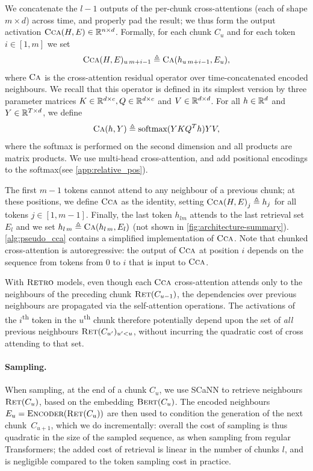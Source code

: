 \documentclass[11pt, a4paper, logo]{deepmind}
\newcommand{\encoder} {\textsc{Encoder}}
\newcommand{\ccca}{\textsc{Cca}}
\newcommand{\crossattention}{\textsc{Ca}}
\newcommand{\softmax}{\textrm{softmax}}
\newcommand{\ret}{\textsc{Ret}}
\newcommand{\bert}{\textsc{Bert}\xspace}
\renewcommand{\encoder}{\textsc{Encoder}}
\newcommand{\retro}{\textsc{Retro}\xspace}
\begin{document}
We concatenate the $l{-}1$ outputs of the per-chunk cross-attentions (each of shape $m \times d$) across time, and properly pad the result; we thus form the output activation $\ccca(H, E) \in \RR^{n \times d}$. Formally, for each chunk $C_u$ and for each token $i \in [1, m]$ we set
\begin{equation}
    \ccca(H, E)_{u\, m + i - 1} \triangleq \crossattention(h_{u \,m + i - 1}, E_{u}),
\end{equation}
where $\crossattention$ is the cross-attention residual operator over time-concatenated encoded neighbours. We recall that this operator is defined in its simplest version by three parameter matrices $K \in \mathbb{R}^{d \times c}, Q \in \mathbb{R}^{d \times c}$ and $V \in \mathbb{R}^{d \times d}$. For all $h \in \mathbb{R}^d$ and $Y \in \mathbb{R}^{T \times d}$, we define
\begin{equation}
    \crossattention(h, Y) \triangleq \softmax(Y K Q^T h) Y V,
\end{equation}
where the softmax is performed on the second dimension and all products are matrix products. We use multi-head cross-attention, and add positional encodings to the \softmax (see \autoref{app:relative_pos}).

The first $m-1$ tokens cannot attend to any neighbour of a previous chunk; at these positions, we define $\ccca$ as the identity, setting ${\ccca(H, E)}_j \triangleq h_j$ for all tokens $j \in [1, m-1]$. 
Finally, the last token $h_{l m}$ attends to the last retrieval set $E_l$ and we set $h_{l\,m} \triangleq \crossattention(h_{l\,m}, E_l)$ (not shown in \autoref{fig:architecture-summary}). 
\autoref{alg:pseudo_cca} contains a simplified implementation of $\ccca$.
Note that chunked cross-attention is autoregressive: the output of $\ccca$ at position $i$ depends on the sequence from tokens from $0$ to $i$ that is input to $\ccca$.

With $\retro$ models, even though each $\ccca$ cross-attention attends only to the neighbours of the preceding chunk $\ret(C_{u-1})$, the dependencies over previous neighbours are propagated via the self-attention operations. 
The activations of the $i$\textsuperscript{th} token in the $u$\textsuperscript{th} chunk therefore potentially depend upon the set of \emph{all} previous neighbours $\ret(C_{u'})_{u'<u}$, without incurring the quadratic cost of cross attending to that set.   

\paragraph{Sampling.} When sampling, at the end of a chunk $C_u$, we use SCaNN to retrieve neighbours $\ret(C_u)$, based on the embedding $\bert(C_u)$. The encoded neighbours $E_u = \encoder(\ret(C_u))$ are then used to condition the generation of the next chunk~$C_{u+1}$, which we do incrementally: overall the cost of sampling is thus quadratic in the size of the sampled sequence, as when sampling from regular Transformers; the added cost of retrieval is linear in the number of chunks $l$, and is negligible compared to the token sampling cost in practice.
\end{document}
